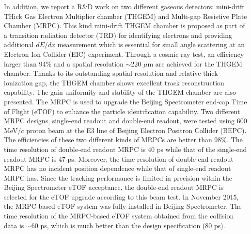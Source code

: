 \begin{enabstract}
In addition, we report a R\&D work on two different gaseous detectors: mini-drift THick Gas Electron Multiplier chamber (THGEM) and Multi-gap Resistive Plate Chamber (MRPC). This kind mini-drift THGEM chamber is proposed as part of a transition radiation detector (TRD) for identifying electrons and providing additional $dE/dx$ measurement which is essential for small angle scattering at an Electron Ion Collider (EIC) experiment. Through a cosmic ray test, an efficiency larger than 94\% and a spatial resolution $\sim$220 $\mu$m are achieved for the THGEM chamber. Thanks to its outstanding spatial resolution and relative thick ionization gap, the THGEM chamber shows excellent track reconstruction capability. The gain uniformity and stability of the THGEM chamber are also presented. The MRPC is used to upgrade the Beijing Spectrometer end-cap Time of Flight (eTOF) to enhance the particle identification capability. Two different MRPC designs, single-end readout and double-end readout, were tested using 600 MeV/$c$ proton beam at the E3 line of Beijing Electron Positron Collider (BEPC\uppercase\expandafter{}). The efficiencies of these two different kinds of MRPCs are better than 98\%. The time resolution of double-end readout MRPC is 40 ps while that of the single-end readout MRPC is 47 ps. Moreover, the time resolution of double-end readout MRPC has no incident position dependence while that of single-end readout MRPC has. Since the tracking performance is limited in precision within the Beijing Spectrometer eTOF acceptance, the double-end readout MRPC is selected for the eTOF upgrade according to this beam test. In November 2015, the MRPC-based eTOF system was fully installed in Beijing Spectrometer. The time resolution of the MRPC-based eTOF system obtained from the collision data is $\sim$60 ps, which is much better than the design specification (80 ps).

\end{enabstract}

